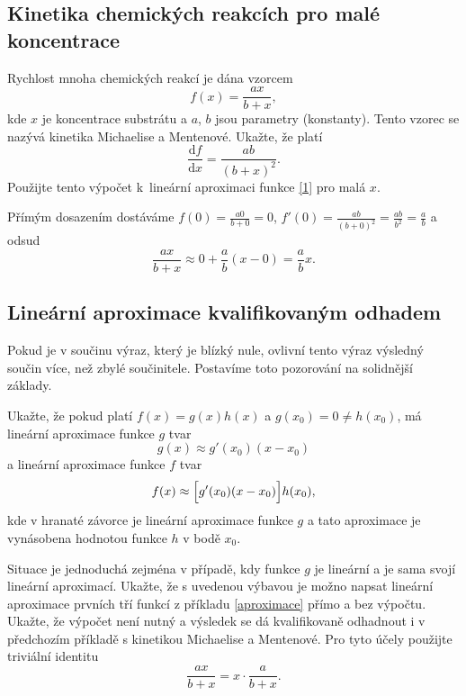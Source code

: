 \stranka

\subsection{Kinetika chemických reakcích pro malé koncentrace} Rychlost mnoha chemických reakcí je dána vzorcem
\begin{equation}\label{1}
  f(x)=\frac {ax}{b+x},
\end{equation}
kde $x$ je koncentrace substrátu a $a$, $b$ jsou parametry (konstanty). Tento vzorec se nazývá kinetika  Michaelise a Mentenové. Ukažte, že platí
\begin{equation*}
  \frac{\mathrm df}{\mathrm dx}=\frac{ab}{(b+x)^2}.
\end{equation*}
Použijte tento výpočet k lineární aproximaci funkce \eqref{1} pro malá $x$.%

\reseni

Přímým dosazením dostáváme $f(0)=\frac {a0}{b+0}=0$, $f'(0)=\frac{ab}{(b+0)^2}=\frac {ab}{b^2}=\frac ab$ a odsud
$$\frac {ax}{b+x}\approx 0+\frac ab (x-0)=\frac ab x.$$
\konec

\stranka

\subsection{Lineární aproximace kvalifikovaným odhadem}

Pokud je v součinu výraz, který je blízký nule, ovlivní tento výraz výsledný součin více, než zbylé součinitele. Postavíme toto pozorování na solidnější základy.

Ukažte, že pokud platí $f(x)=g(x)h(x)$ a $g(x_0)=0\neq h(x_0)$, má lineární aproximace funkce $g$ tvar
$$g(x)\approx g'(x_0)(x-x_0)$$ a lineární aproximace funkce $f$ tvar
$$f(x)\approx \Bigl[g'(x_0) (x-x_0)\Bigr]h(x_0),$$
kde v hranaté závorce je lineární aproximace funkce $g$ a tato aproximace je vynásobena hodnotou funkce $h$ v bodě $x_0$.

Situace je jednoduchá zejména v případě, kdy funkce $g$ je lineární a
je sama svojí lineární aproximací. Ukažte, že s uvedenou výbavou je možno
napsat lineární aproximace prvních tří funkcí z příkladu
\ref{aproximace} přímo a bez výpočtu. Ukažte, že výpočet není nutný a výsledek se dá kvalifikovaně odhadnout i v
předchozím příkladě s kinetikou Michaelise a Mentenové. Pro tyto účely použijte triviální identitu
\begin{equation*}
  \frac {ax}{b+x}=x\cdot\frac {a}{b+x}.
\end{equation*}


